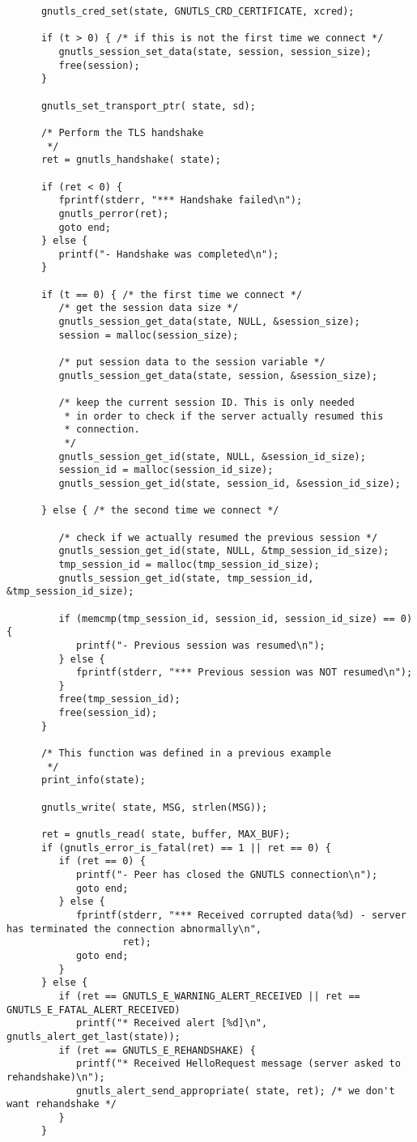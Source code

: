 \begin{verbatim}
      gnutls_cred_set(state, GNUTLS_CRD_CERTIFICATE, xcred);

      if (t > 0) { /* if this is not the first time we connect */
         gnutls_session_set_data(state, session, session_size);
         free(session);
      }
      
      gnutls_set_transport_ptr( state, sd);

      /* Perform the TLS handshake
       */
      ret = gnutls_handshake( state);

      if (ret < 0) {
         fprintf(stderr, "*** Handshake failed\n");
         gnutls_perror(ret);
         goto end;
      } else {
         printf("- Handshake was completed\n");
      }

      if (t == 0) { /* the first time we connect */
         /* get the session data size */
         gnutls_session_get_data(state, NULL, &session_size);
         session = malloc(session_size);

         /* put session data to the session variable */
         gnutls_session_get_data(state, session, &session_size);

         /* keep the current session ID. This is only needed
          * in order to check if the server actually resumed this
          * connection.
          */
         gnutls_session_get_id(state, NULL, &session_id_size);
         session_id = malloc(session_id_size);
         gnutls_session_get_id(state, session_id, &session_id_size);

      } else { /* the second time we connect */

         /* check if we actually resumed the previous session */
         gnutls_session_get_id(state, NULL, &tmp_session_id_size);
         tmp_session_id = malloc(tmp_session_id_size);
         gnutls_session_get_id(state, tmp_session_id, &tmp_session_id_size);

         if (memcmp(tmp_session_id, session_id, session_id_size) == 0) {
            printf("- Previous session was resumed\n");
         } else {
            fprintf(stderr, "*** Previous session was NOT resumed\n");
         }
         free(tmp_session_id);
         free(session_id);
      }

      /* This function was defined in a previous example
       */
      print_info(state);

      gnutls_write( state, MSG, strlen(MSG));

      ret = gnutls_read( state, buffer, MAX_BUF);
      if (gnutls_error_is_fatal(ret) == 1 || ret == 0) {
         if (ret == 0) {
            printf("- Peer has closed the GNUTLS connection\n");
            goto end;
         } else {
            fprintf(stderr, "*** Received corrupted data(%d) - server has terminated the connection abnormally\n",
                    ret);
            goto end;
         }
      } else {
         if (ret == GNUTLS_E_WARNING_ALERT_RECEIVED || ret == GNUTLS_E_FATAL_ALERT_RECEIVED)
            printf("* Received alert [%d]\n", gnutls_alert_get_last(state));
         if (ret == GNUTLS_E_REHANDSHAKE) {
            printf("* Received HelloRequest message (server asked to rehandshake)\n");
            gnutls_alert_send_appropriate( state, ret); /* we don't want rehandshake */
         }
      }


\end{verbatim}
